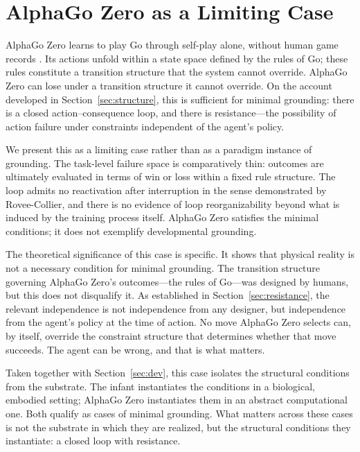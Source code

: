 \documentclass[11pt]{article}
\begin{document}
\section{AlphaGo Zero as a Limiting Case}
\label{sec:alphago}

AlphaGo Zero learns to play Go through self-play alone, without human
game records \citep{Silver2017}. Its actions unfold within a state
space defined by the rules of Go; these rules constitute a transition
structure that the system cannot override. AlphaGo Zero can lose under a transition structure it cannot override. On
the account developed in Section~\ref{sec:structure}, this is
sufficient for minimal grounding: there is a closed action--consequence
loop, and there is resistance---the possibility of action failure under
constraints independent of the agent's policy.

We present this as a limiting case rather than as a paradigm instance
of grounding. The task-level failure space is comparatively thin:
outcomes are ultimately evaluated in terms of win or loss within a
fixed rule structure. The loop admits no reactivation after
interruption in the sense demonstrated by Rovee-Collier, and there is
no evidence of loop reorganizability beyond what is induced by the
training process itself. AlphaGo Zero satisfies the minimal
conditions; it does not exemplify developmental grounding.

The theoretical significance of this case is specific. It shows that
physical reality is not a necessary condition for minimal grounding.
The transition structure governing AlphaGo Zero's outcomes---the rules
of Go---was designed by humans, but this does not disqualify it. As
established in Section~\ref{sec:resistance}, the relevant independence
is not independence from any designer, but independence from the
agent's policy at the time of action. No move AlphaGo Zero selects can,
by itself, override the constraint structure that determines whether
that move succeeds. The agent can be wrong, and that is what matters.

Taken together with Section~\ref{sec:dev}, this case isolates the
structural conditions from the substrate. The infant instantiates the
conditions in a biological, embodied setting; AlphaGo Zero instantiates
them in an abstract computational one. Both qualify as cases of minimal
grounding. What matters across these cases is not the substrate in
which they are realized, but the structural conditions they instantiate:
a closed loop with resistance.
\end{document}
